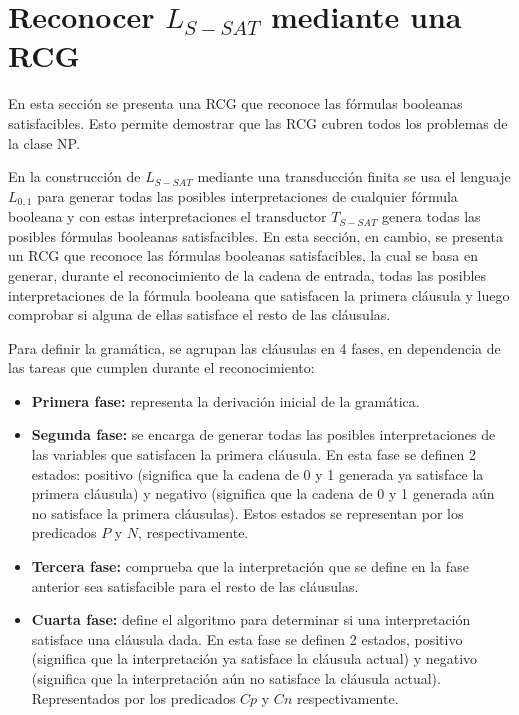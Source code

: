 \documentclass[12pt]{article}
\begin{document}
\section{Reconocer $L_{S-SAT}$ mediante una RCG}

En esta sección se presenta una RCG que reconoce las fórmulas booleanas satisfacibles. Esto permite demostrar
que las RCG cubren todos los problemas de la clase NP.

En la construcción de $L_{S-SAT}$ mediante una transducción finita se usa el lenguaje $L_{0,1}$ para generar
todas las posibles interpretaciones de cualquier fórmula booleana y con estas interpretaciones el transductor
$T_{S-SAT}$ genera todas las posibles fórmulas booleanas satisfacibles.  En esta sección, en cambio,
se presenta un RCG que reconoce las fórmulas booleanas satisfacibles, la cual se basa en generar, durante el
reconocimiento de la cadena de entrada, todas las posibles interpretaciones de la fórmula booleana que
satisfacen la primera cláusula y luego comprobar si alguna de ellas satisface el resto de las cláusulas.

Para definir la gramática, se agrupan las cláusulas en 4 fases, en dependencia de las tareas que cumplen durante el reconocimiento:

\begin{itemize}
    \item \textbf{Primera fase:} representa la derivación inicial de la gramática.
    \item \textbf{Segunda fase:} se encarga de generar todas las posibles interpretaciones
          de las variables que satisfacen la primera cláusula. En esta fase se definen 2 estados: positivo (significa
          que la cadena de 0 y 1 generada ya satisface la primera cláusula) y negativo (significa que la cadena de 0 y 1
          generada aún no satisface la primera cláusulas). Estos estados se representan por los predicados $P$ y $N$, respectivamente.

    \item \textbf{Tercera fase:} comprueba que la interpretación que se define en la fase anterior sea satisfacible para
          el resto de las cláusulas.
    \item \textbf{Cuarta fase:} define el algoritmo para determinar si una interpretación satisface una cláusula
          dada. En esta fase se definen 2 estados, positivo (significa que la interpretación ya satisface la cláusula
          actual) y negativo (significa que la interpretación aún no satisface la cláusula actual). Representados por
          los predicados $Cp$ y $Cn$ respectivamente.

\end{itemize}
\end{document}
